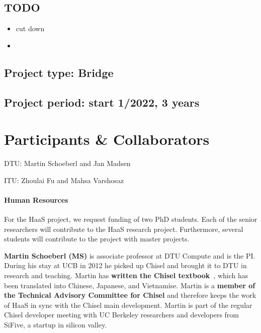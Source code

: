 \documentclass[fleqn,12pt]{article}
\begin{document}
\subsection*{TODO}

\begin{itemize}
\item cut down
\item 
\end{itemize}

\subsection*{Project type: Bridge}

\subsection*{Project period: start 1/2022, 3 years}

\section*{Participants \& Collaborators}

\noindent DTU: Martin Schoeberl and Jan Madsen

\noindent ITU: Zhoulai Fu and Mahsa Varshosaz

\paragraph*{Human Resources}

For the HaaS project, we request funding of two PhD students.
Each of the senior researchers will contribute to the HaaS research project.
Furthermore, several students will contribute to the project with
master projects.
%
%


{\bf Martin Schoeberl (MS)} is associate professor at DTU Compute and is the PI.
During his stay
at UCB in 2012 he picked up Chisel and brought it to DTU in research and teaching.
Martin has {\bf written the Chisel textbook}~\cite{chisel:book}, which has been translated
into Chinese, Japanese, and Vietnamise. Martin is a {\bf member of the Technical Advisory Committee for
Chisel} and therefore keeps the work of HaaS in sync with the Chisel main development.
Martin is part of the regular Chisel developer meeting with
UC Berkeley researchers and developers from SiFive, a startup in silicon valley.
\end{document}
